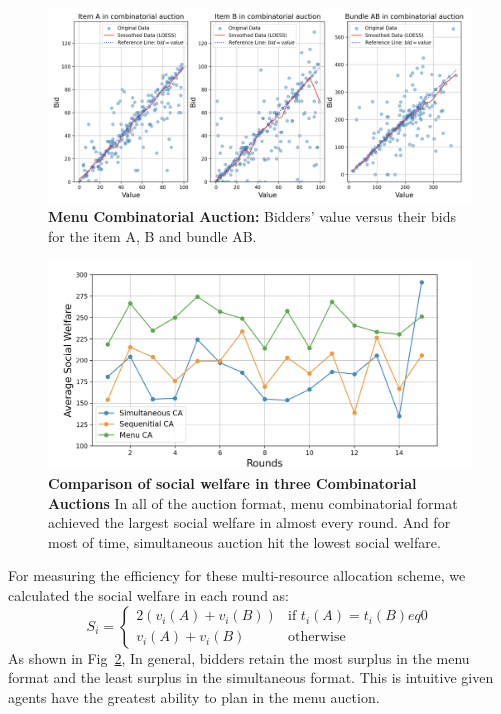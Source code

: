 \documentclass{article} %
\begin{document}
\begin{figure}[h]
    \centering \includegraphics[width=\linewidth]{Figs/menu.png}
    \caption{\textbf{Menu Combinatorial Auction:} Bidders' value versus their bids for the item A, B and bundle AB. }
    \label{fig:menu}
\end{figure}


\begin{figure}[h]
    \centering \includegraphics[width=0.9\linewidth]{Figs/social_welfare.png}
    \caption{\textbf{Comparison of social welfare in three Combinatorial Auctions} In all of the auction format, menu combinatorial format achieved the largest social welfare in almost every round. 
    And for most of time, simultaneous auction hit the lowest social welfare.}
    \label{fig:social}
\end{figure}

For measuring the efficiency for these multi-resource allocation scheme, we calculated the social welfare in each round as:
\begin{equation}
   S_i = 
   \begin{cases}
      2 \left( v_i(A) + v_i(B) \right) & \text{if } t_i(A) = t_i(B) eq 0\\
      v_i(A) + v_i(B) & \text{otherwise}
   \end{cases}
\end{equation}
As shown in Fig~\ref{fig:social}, In general, bidders retain the most surplus in the menu format and the least surplus in the simultaneous format. 
This is intuitive given agents have the greatest ability to plan in the menu auction.
\end{document}

